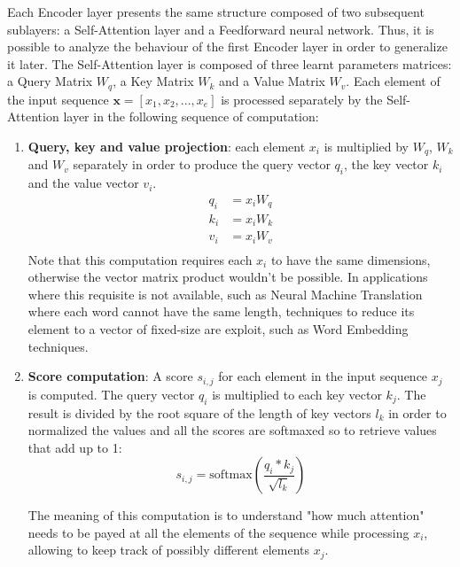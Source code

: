                 Each Encoder layer presents the same structure composed of two subsequent sublayers: a Self-Attention layer and a Feedforward neural network. Thus, it is possible to analyze the behaviour of the first Encoder layer in order to generalize it later. \newline
                The Self-Attention layer is composed of three learnt parameters matrices: a Query Matrix $W_q$, a Key Matrix $W_k$ and a Value Matrix $W_v$. Each element of the input sequence $\mathbf{x} = [x_1, x_2, ..., x_e]$ is processed separately by the Self-Attention layer in the following sequence of computation:
                \begin{enumerate}
                    \item \textbf{Query, key and value projection}: each element $x_i$ is multiplied by $W_q$, $W_k$ and $W_v$ separately in order to produce the query vector $q_i$, the key vector $k_i$ and the value vector $v_i$.
                    \begin{align*}
                        q_i &= x_i W_q\\
                        k_i &= x_i W_k\\
                        v_i &= x_i W_v\\
                    \end{align*}
                    Note that this computation requires each $x_i$ to have the same dimensions, otherwise the vector matrix product wouldn't be possible. In applications where this requisite is not available, such as Neural Machine Translation where each word cannot have the same length, techniques to reduce its element to a vector of fixed-size are exploit, such as Word Embedding techniques.
                    
                    \item \textbf{Score computation}: A score $s_{i, j}$ for each element in the input sequence $x_j$ is computed. The query vector $q_i$ is multiplied to each key vector $k_j$. The result is divided by the root square of the length of key vectors $l_k$ in order to normalized the values and all the scores are softmaxed so to retrieve values that add up to 1:
                    \[ s_{i,j} = \text{softmax} \left( \frac{q_i * k_j}{\sqrt{l_k}} \right) \]
                    
                    The meaning of this computation is to understand "how much attention" needs to be payed at all the elements of the sequence while processing $x_i$, allowing to keep track of possibly different elements $x_j$.
                    

\end{enumerate}

